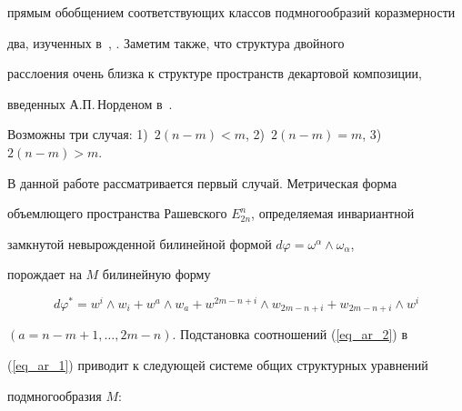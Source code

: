 прямым обобщением соответствующих классов подмногообразий коразмерности


два, изученных в~\cite{ar7}, \cite{ar8}. Заметим также, что структура двойного


расслоения очень близка к структуре пространств декартовой композиции,


введенных А.П.\,Норденом в~\cite{ar9}.





Возможны три случая: 1)~$2(n-m)<m$, 2)~$2(n-m)=m$, 3)~$2(n-m)>m$.


В данной работе рассматривается первый случай. Метрическая форма


объемлющего пространства Рашевского $E^n_{2n}$, определяемая инвариантной


замкнутой невырожденной билинейной формой $d\varphi=\omega^\alpha


\wedge\omega_\alpha$,


порождает на $M$ билинейную форму


$$


d\varphi^*=w^i\wedge w_i+w^a\wedge w_a+w^{2m-n+i}\wedge w_{2m-n+i}+w_{2m-


n+i}\wedge w^i


$$


$(a=n-m+1, \dotsc, 2m-n)$. Подстановка соотношений (\ref{eq_ar_2}) в


(\ref{eq_ar_1}) приводит к следующей системе общих структурных уравнений


подмногообразия $M$:



